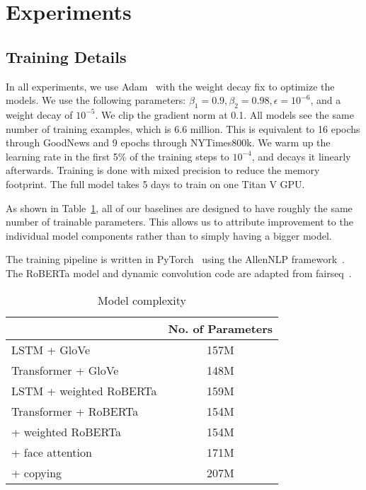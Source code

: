 
\section{Experiments}

\subsection{Training Details}

In all experiments, we use Adam~\cite{Kingma2015Adam} with the weight decay fix
\cite{Loshchilov2018DecoupledWD} to optimize the models. We use the following
parameters: $\beta_1 = 0.9, \beta_2 = 0.98, \epsilon = 10^{-6}$, and a weight
decay of $10^{-5}$. We clip the gradient norm at 0.1. All models see the same
number of training examples, which is 6.6 million. This is equivalent to 16
epochs through GoodNews and 9 epochs through NYTimes800k. We warm up the
learning rate in the first 5\% of the training steps to $10^{-4}$, and decays
it linearly afterwards. Training is done with mixed precision to reduce the
memory footprint. The full model takes 5 days to train on one Titan V GPU.

As shown in Table~\ref{tab:models}, all of our baselines are designed to have
roughly the same number of trainable parameters. This allows us to attribute
improvement to the individual model components rather than to simply having a
bigger model.

The training pipeline is written in PyTorch~\cite{Paszke2017Automatic} using
the AllenNLP framework~\cite{Gardner2017AllenNLP}. The RoBERTa model and
dynamic convolution code are adapted from fairseq~\cite{Ott2019Fairseq}.

\begin{table}[t]
	\caption {Model complexity}
	\label{tab:models}
	\centering
	\begin{tabularx}{\linewidth}{Xc}
		\toprule
        & No. of Parameters \\
      \midrule
      LSTM + GloVe & 157M \\
      Transformer + GloVe & 148M \\
      LSTM + weighted RoBERTa & 159M \\
      \midrule
      Transformer + RoBERTa & 154M \\
      \quad + weighted RoBERTa & 154M \\
      \quad\quad + face attention & 171M \\
      \quad\quad\quad + copying & 207M \\
		\bottomrule
	\end{tabularx}
\end{table}

